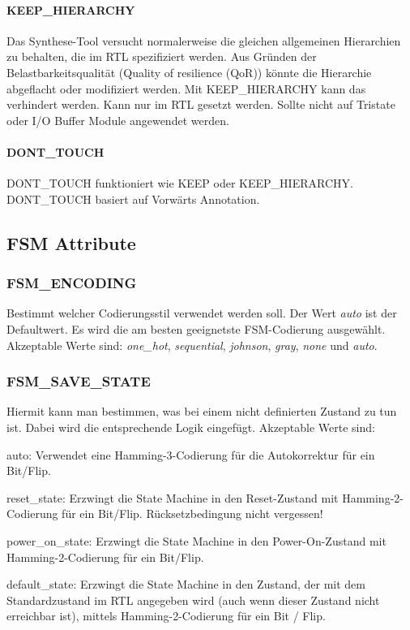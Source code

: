 \paragraph{KEEP\_HIERARCHY}$~$ \\
Das Synthese-Tool versucht normalerweise die gleichen allgemeinen Hierarchien zu behalten, die im RTL spezifiziert werden. Aus Gründen der Belastbarkeitsqualität (Quality of resilience (QoR)) könnte die Hierarchie abgeflacht oder modifiziert werden. Mit KEEP\_HIERARCHY kann das verhindert werden. Kann nur im RTL gesetzt werden. Sollte nicht auf Tristate oder I/O Buffer Module angewendet werden.


\paragraph{DONT\_TOUCH}$~$ \\
DONT\_TOUCH funktioniert wie KEEP oder KEEP\_HIERARCHY. DONT\_TOUCH basiert auf Vorwärts Annotation.

\subsection{FSM Attribute}
\subsubsection{FSM\_ENCODING}
Bestimmt welcher Codierungsstil verwendet werden soll. Der Wert \textit{auto} ist der Defaultwert. Es wird die am besten geeignetste FSM-Codierung ausgewählt. Akzeptable Werte sind: \textit{one\_hot}, \textit{sequential}, \textit{johnson}, \textit{gray}, \textit{none} und \textit{auto}.


\subsubsection{FSM\_SAVE\_STATE}
Hiermit kann man bestimmen, was bei einem nicht definierten Zustand zu tun ist. Dabei wird die entsprechende Logik eingefügt. Akzeptable Werte sind:
\begin{compactitem}
    \item auto: Verwendet eine Hamming-3-Codierung für die Autokorrektur für ein Bit/Flip.
    \item reset\_state: Erzwingt die State Machine in den Reset-Zustand mit Hamming-2-Codierung für ein Bit/Flip. Rücksetzbedingung nicht vergessen!
    \item power\_on\_state: Erzwingt die State Machine in den Power-On-Zustand mit Hamming-2-Codierung für ein Bit/Flip.
    \item default\_state: Erzwingt die State Machine in den Zustand, der mit dem Standardzustand im RTL angegeben wird (auch wenn dieser Zustand nicht erreichbar ist), mittels Hamming-2-Codierung für ein Bit / Flip.
\end{compactitem}


